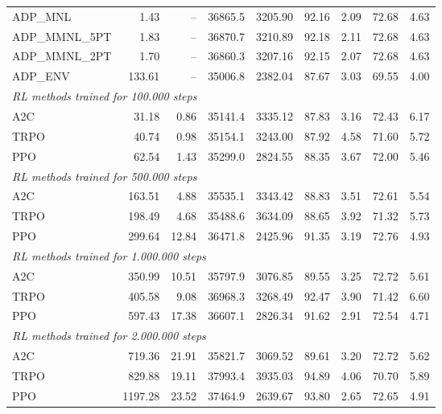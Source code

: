 \begin{samepage}
\begin{center}
\begin{tabular}{l|rr|rr|rr|rr}
    \midrule
    ADP\_MNL     &     1.43 &    -- &    36865.5 &    3205.90 &   92.16 &    2.09 &   72.68 &    4.63 \\
    ADP\_MMNL\_5PT &     1.83 &    -- &    36870.7 &    3210.89 &   92.18 &    2.11 &   72.68 &    4.63 \\
    ADP\_MMNL\_2PT &     1.70 &    -- &    36860.3 &    3207.16 &   92.15 &    2.07 &   72.68 &    4.63 \\
    ADP\_ENV     &   133.61 &    -- &    35006.8 &    2382.04 &   87.67 &    3.03 &   69.55 &    4.00 \\
    \midrule
    \multicolumn{9}{l}{\textit{RL methods trained for 100.000 steps}} \\
    \midrule
    A2C          &    31.18 &     0.86 &    35141.4 &    3335.12 &   87.83 &    3.16 &   72.43 &    6.17 \\
    TRPO         &    40.74 &     0.98 &    35154.1 &    3243.00 &   87.92 &    4.58 &   71.60 &    5.72 \\
    PPO          &    62.54 &     1.43 &    35299.0 &    2824.55 &   88.35 &    3.67 &   72.00 &    5.46 \\
    \midrule
    \multicolumn{9}{l}{\textit{RL methods trained for 500.000 steps}} \\
    \midrule
    A2C          &   163.51 &     4.88 &    35535.1 &    3343.42 &   88.83 &    3.51 &   72.61 &    5.54 \\
    TRPO         &   198.49 &     4.68 &    35488.6 &    3634.09 &   88.65 &    3.92 &   71.32 &    5.73 \\
    PPO          &   299.64 &    12.84 &    36471.8 &    2425.96 &   91.35 &    3.19 &   72.76 &    4.93 \\
    \midrule
    \multicolumn{9}{l}{\textit{RL methods trained for 1.000.000 steps}} \\
    \midrule
    A2C          &   350.99 &    10.51 &    35797.9 &    3076.85 &   89.55 &    3.25 &   72.72 &    5.61 \\
    TRPO         &   405.58 &     9.08 &    36968.3 &    3268.49 &   92.47 &    3.90 &   71.42 &    6.60 \\
    PPO          &   597.43 &    17.38 &    36607.1 &    2826.34 &   91.62 &    2.91 &   72.54 &    4.71 \\
    \midrule
    \multicolumn{9}{l}{\textit{RL methods trained for 2.000.000 steps}} \\
    \midrule
    A2C          &   719.36 &    21.91 &    35821.7 &    3069.52 &   89.61 &    3.20 &   72.72 &    5.62 \\
    TRPO         &   829.88 &    19.11 &    37993.4 &    3935.03 &   94.89 &    4.06 &   70.70 &    5.89 \\
    PPO          &  1197.28 &    23.52 &    37464.9 &    2639.67 &   93.80 &    2.65 &   72.65 &    4.91 \\
    \bottomrule
  \end{tabular}
\end{center}
\end{samepage}

